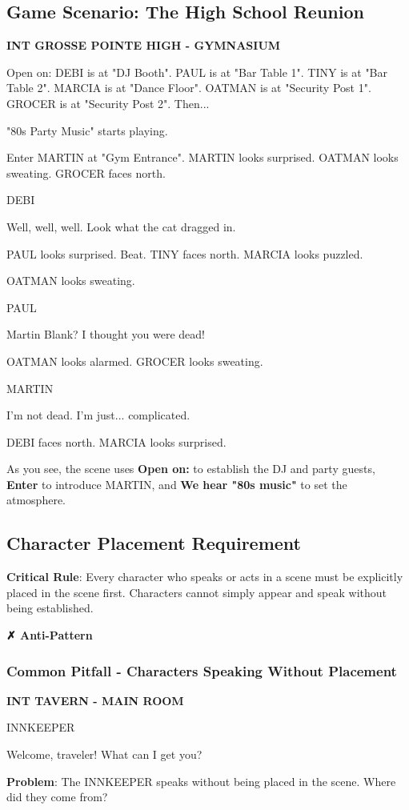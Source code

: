 \documentclass[11pt,letterpaper,oldstylefigures]{memoir}
\newcommand{\slugline}[1]{\nobreak\textbf{\MakeUppercase{#1}}\par\nobreak\vspace{1\baselineskip}}
\newcommand{\speaker}[1]{\nobreak\hspace*{0.333\textwidth}\MakeUppercase{#1}\par\nobreak\vspace{0.5\baselineskip}}
\newcommand{\dialogue}[1]{\nobreak\hspace*{0.25\textwidth}\begin{minipage}{0.5\textwidth}#1\end{minipage}\par\vspace{1\baselineskip}}
\newcommand{\stagedir}[1]{#1\par\vspace{1\baselineskip}}
\newenvironment{FountainExample}
  {\begingroup
  \ttfamily\small
   \setlength{\parindent}{0pt}
  \setlength{\parskip}{0.5em}
  \allowdisplaybreaks
  \setlength{\displaywidowpenalty}{0}
  \setlength{\widowpenalty}{0}
  \setlength{\clubpenalty}{0}
  \setlength{\interlinepenalty}{0}
}
  {\endgroup}
\newenvironment{AntiPattern}
{\begingroup
\small
\setlength{\parindent}{0pt}
\setlength{\parskip}{0.5em}
\allowdisplaybreaks
\setlength{\displaywidowpenalty}{0}
\setlength{\widowpenalty}{0}
\setlength{\clubpenalty}{0}
\setlength{\interlinepenalty}{0}
\begin{tcolorbox}[
    colback=red!5,
    colframe=red!75!black,
    boxrule=0.5pt,
    arc=2pt,
    left=0.5em,
    right=0.5em,
    top=0.25em,
    bottom=0.25em
]
\textbf{✗ Anti-Pattern}
\end{tcolorbox}\par
}
{\endgroup}
\newcommand{\fountain}[1]{\textbf{#1}}
\begin{document}
\subsection{Game Scenario: The High School Reunion}
\begin{FountainExample}
\slugline{INT GROSSE POINTE HIGH - GYMNASIUM}

\stagedir{Open on: DEBI is at "DJ Booth". PAUL is at "Bar Table 1".
TINY is at "Bar Table 2". MARCIA is at "Dance Floor". OATMAN is at "Security Post 1".
GROCER is at "Security Post 2". Then...}
\stagedir{"80s Party Music" starts playing.}
\stagedir{Enter MARTIN at "Gym Entrance". MARTIN looks surprised. OATMAN looks sweating. GROCER faces north.}

\speaker{DEBI}
\dialogue{Well, well, well. Look what the cat dragged in.}

\stagedir{PAUL looks surprised. Beat. TINY faces north. MARCIA looks puzzled.}
\stagedir{OATMAN looks sweating.}

\speaker{PAUL}
\dialogue{Martin Blank? I thought you were dead!}

\stagedir{OATMAN looks alarmed. GROCER looks sweating.}

\speaker{MARTIN}
\dialogue{I'm not dead. I'm just... complicated.}

\stagedir{DEBI faces north. MARCIA looks surprised.}
\end{FountainExample}

As you see, the scene uses \fountain{Open on:} to establish the DJ and party guests, \fountain{Enter} to introduce MARTIN, and \fountain{We hear "80s music"} to set the atmosphere.

\subsection{Character Placement Requirement}

\textbf{Critical Rule}: Every character who speaks or acts in a scene must be explicitly placed in the scene first. Characters cannot simply appear and speak without being established.

\begin{AntiPattern}
\subsubsection{Common Pitfall - Characters Speaking Without Placement}
\begin{FountainExample}
\slugline{INT TAVERN - MAIN ROOM}

\speaker{INNKEEPER}
\dialogue{Welcome, traveler! What can I get you?}
\end{FountainExample}

\textbf{Problem}: The INNKEEPER speaks without being placed in the scene. Where did they come from?
\end{AntiPattern}
\end{document}

